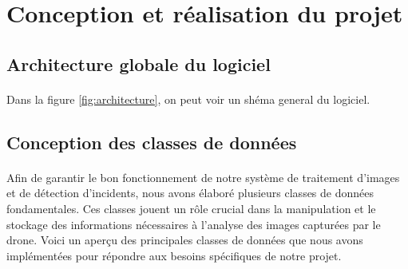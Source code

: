 \newpage
\section{Conception et réalisation du projet}
\label{sec:impl}

\subsection{Architecture globale du logiciel}
\paragraph{} Dans la figure \ref{fig:architecture}, on peut voir un shéma general du logiciel.



\subsection{Conception des classes de données}
\paragraph{}Afin de garantir le bon fonctionnement de notre système de traitement d’images et de détection d’incidents, nous avons élaboré plusieurs classes de données fondamentales. Ces classes jouent un rôle crucial dans la manipulation et le stockage des informations nécessaires à l'analyse des images capturées par le drone. Voici un aperçu des principales classes de données que nous avons implémentées pour répondre aux besoins spécifiques de notre projet.
